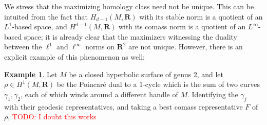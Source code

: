 \documentclass[reqno,11pt]{amsart}
\newcommand{\NN}{\mathbf{N}}
\newcommand{\RR}{\mathbf{R}}
\newcommand{\MCL}{\mathrm{MCL}}
\newcommand{\dfn}[1]{\emph{#1}\index{#1}}
\newtheorem{proposition}[theorem]{Proposition}
\theoremstyle{definition}
\newtheorem{definition}[theorem]{Definition}
\newtheorem{example}[theorem]{Example}
\numberwithin{equation}{section}
\newcommand\todo[1]{\textcolor{red}{TODO: #1}}
\begin{document}
We stress that the maximizing homology class need not be unique.
This can be intuited from the fact that $H_{d - 1}(M, \RR)$ with its stable norm is a quotient of an $L^1$-based space, and $H^{d - 1}(M, \RR)$ with its comass norm is a quotient of an $L^\infty$-based space; it is already clear that the maximizers witnessing the duality between the $\ell^1$ and $\ell^\infty$ norms on $\RR^2$ are not unique.
However, there is an explicit example of this phenomenon as well:

\begin{example}
Let $M$ be a closed hyperbolic surface of genus $2$, and let $\rho \in H^1(M, \RR)$ be the Poincar\'e dual to a $1$-cycle which is the sum of two curves $\gamma_1, \gamma_2$, each of which winds around a different handle of $M$.
Identifying the $\gamma_j$ with their geodesic representatives, and taking a best comass representative $F$ of $\rho$, 
\todo{I doubt this works}
\end{example}




\end{document}
